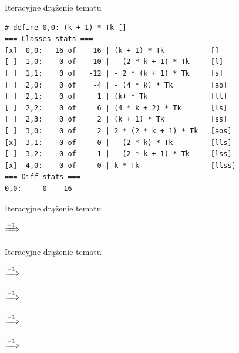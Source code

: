 \documentclass[final]{beamer}
\theoremstyle{bluetheorem}
\theoremstyle{bluetheorem}
\theoremstyle{greentheorem}
\newcommand{\includeinlinesvg}[2]{\begin{minipage}{#1\textwidth}\end{minipage}}
\newcommand{\includeinlinescaledsvg}[3]{\begin{minipage}{#1\textwidth}\begin{center}\end{center}\end{minipage}}
\begin{document}
\begin{frame}[fragile]{Iteracyjne drążenie tematu}
    \begin{block}{}
\begin{lstlisting}
# define 0,0: (k + 1) * Tk []
=== Classes stats ===
[x]  0,0:   16 of    16 | (k + 1) * Tk           []
[ ]  1,0:    0 of   -10 | - (2 * k + 1) * Tk     [l]
[ ]  1,1:    0 of   -12 | - 2 * (k + 1) * Tk     [s]
[ ]  2,0:    0 of    -4 | - (4 * k) * Tk         [ao]
[ ]  2,1:    0 of     1 | (k) * Tk               [ll]
[ ]  2,2:    0 of     6 | (4 * k + 2) * Tk       [ls]
[ ]  2,3:    0 of     2 | (k + 1) * Tk           [ss]
[ ]  3,0:    0 of     2 | 2 * (2 * k + 1) * Tk   [aos]
[x]  3,1:    0 of     0 | - (2 * k) * Tk         [lls]
[ ]  3,2:    0 of    -1 | - (2 * k + 1) * Tk     [lss]
[x]  4,0:    0 of     0 | k * Tk                 [llss]
=== Diff stats ===
0,0:     0    16
\end{lstlisting}
    \end{block}
\end{frame}

\begin{frame}{Iteracyjne drążenie tematu}
    \begin{block}{}
        \begin{center}
            \includeinlinescaledsvg{.4}{.4}{lambda__transformations__002a}%
            \(\xRightarrow{-1}\)%
            \includeinlinescaledsvg{.4}{.4}{lambda__transformations__002b}%
        \end{center}
    \end{block}
\end{frame}

\begin{frame}{Iteracyjne drążenie tematu}
    \begin{block}{}
        \begin{center}
\includeinlinesvg{.18}{lambda__trees_100__0_base}\(\xRightarrow{-1}\)\includeinlinesvg{.18}{lambda__trees_100__0}%
\qquad
\includeinlinesvg{.18}{lambda__trees_100__1_base}\(\xRightarrow{-1}\)\includeinlinesvg{.18}{lambda__trees_100__1}%

\includeinlinesvg{.18}{lambda__trees_100__2_base}\(\xRightarrow{-1}\)\includeinlinesvg{.18}{lambda__trees_100__2}%
\qquad
\includeinlinesvg{.18}{lambda__trees_100__3_base}\(\xRightarrow{-1}\)\includeinlinesvg{.18}{lambda__trees_100__3}%
        \end{center}
    \end{block}
\end{frame}
\end{document}
